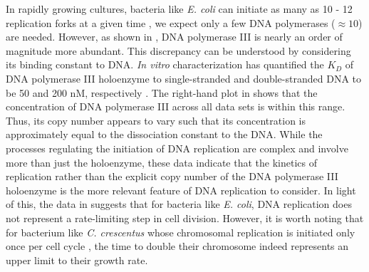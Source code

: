 \begin{figure}

\end{figure}

In rapidly growing cultures, bacteria like \textit{E. coli}
can initiate as many as 10 - 12 replication forks at a
given time \citep{bremer2008, si2017},  we expect only a few DNA polymerases
($\approx 10$) are needed. However, as shown in , DNA
polymerase III is nearly an order of magnitude more abundant. This discrepancy
can be understood by considering its binding constant to DNA. \textit{In vitro} characterization has quantified the $K_D$ of
DNA polymerase III holoenzyme to single-stranded and double-stranded DNA to be
50 and 200 nM, respectively \citep{ason2000}. The right-hand plot in
 shows that the concentration of DNA polymerase III
across all data sets is within this range. Thus, its copy number appears to vary such that its
concentration is approximately equal to the dissociation constant to the DNA.
While the processes regulating the initiation of DNA replication are complex and
involve more than just the holoenzyme, these data indicate that the kinetics of
replication rather than the explicit copy number of the DNA polymerase III
holoenzyme is the more relevant feature of DNA replication to consider. In light
of this, the data in  suggests that for bacteria like
\textit{E. coli}, DNA replication does not represent a rate-limiting step in
cell division. However, it is worth noting that for bacterium like \textit{C.
crescentus} whose chromosomal replication is initiated only once per cell cycle
\citep{jensen2001}, the time to double their chromosome indeed represents an
upper limit to their growth rate.

